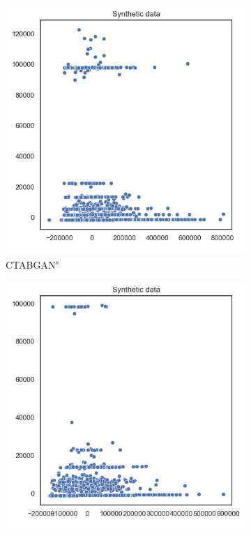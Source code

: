 \begin{figure}[h]
	\centering
	\begin{subfigure}{0.3\textwidth}
		\includegraphics[width=\textwidth]{images/pca/ctabgan_simTune.jpg}
		\caption{CTABGAN$^s$}
	\end{subfigure}
	\begin{subfigure}{0.3\textwidth}
		\includegraphics[width=\textwidth]{images/pca/ctabgan+_simTune.jpg}

\end{subfigure}
\end{figure}

